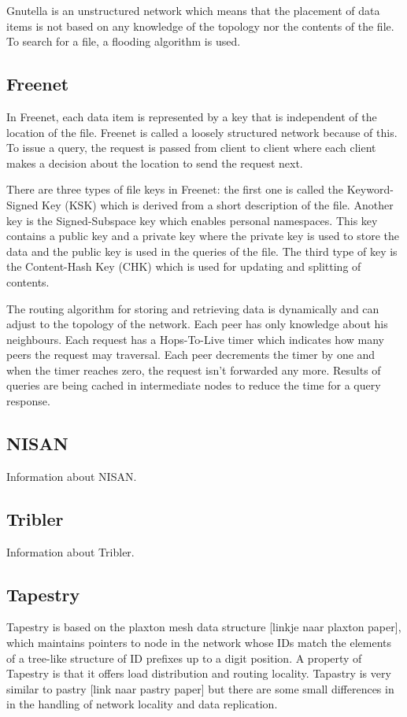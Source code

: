 \documentclass[journal]{IEEEtran}
\begin{document}
			Gnutella is an unstructured network which means that the placement of data items is not based on any knowledge of the topology nor the contents of the file. To search for a file, a flooding algorithm is used.
		
		\subsection{Freenet}
			In Freenet, each data item is represented by a key that is independent of the location of the file. Freenet is called a loosely structured network because of this. To issue a query, the request is passed from client to client where each client makes a decision about the location to send the request next.
		
			There are three types of file keys in Freenet: the first one is called the Keyword-Signed Key (KSK) which is derived from a short description of the file. Another key is the Signed-Subspace key which enables personal namespaces. This key contains a public key and a private key where the private key is used to store the data and the public key is used in the queries of the file. The third type of key is the Content-Hash Key (CHK) which is used for updating and splitting of contents.
		
			The routing algorithm for storing and retrieving data is dynamically and can adjust to the topology of the network. Each peer has only knowledge about his neighbours. Each request has a Hops-To-Live timer which indicates how many peers the request may traversal. Each peer decrements the timer by one and when the timer reaches zero, the request isn't forwarded any more. Results of queries are being cached in intermediate nodes to reduce the time for a query response.
			
		\subsection{NISAN}
			Information about NISAN.
		
		\subsection{Tribler}
			Information about Tribler.
		
		\subsection{Tapestry}
			Tapestry is based on the plaxton mesh data structure [linkje naar plaxton paper], which maintains pointers to node in the network whose IDs match the elements of a tree-like structure of ID prefixes up to a digit position. A property of Tapestry is that it offers load distribution and routing locality. Tapastry is very similar to pastry [link naar pastry paper] but there are some small differences in in the handling of network locality and data replication.
		
\end{document}
